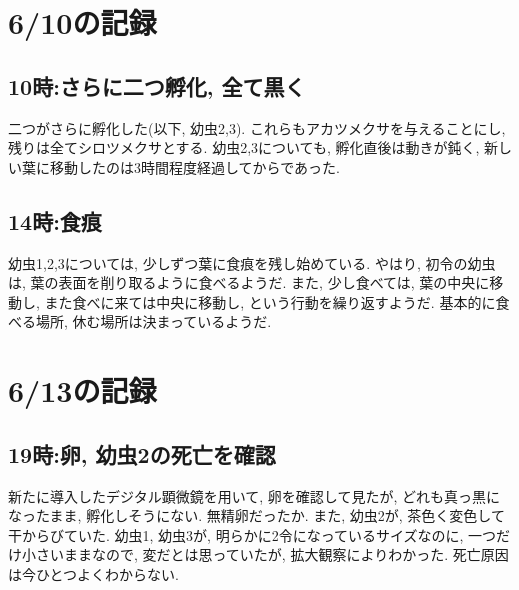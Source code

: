 \documentclass{jsarticle}
\begin{document}
\section{6/10の記録}
\subsection{10時:さらに二つ孵化, 全て黒く}
二つがさらに孵化した(以下, 幼虫2,3). これらもアカツメクサを与えることにし, 残りは全てシロツメクサとする. 
幼虫2,3についても, 孵化直後は動きが鈍く, 新しい葉に移動したのは3時間程度経過してからであった. 

\subsection{14時:食痕}
幼虫1,2,3については, 少しずつ葉に食痕を残し始めている. やはり, 初令の幼虫は, 葉の表面を削り取るように食べるようだ. 
また, 少し食べては, 葉の中央に移動し, また食べに来ては中央に移動し, という行動を繰り返すようだ. 
基本的に食べる場所, 休む場所は決まっているようだ. 

\section{6/13の記録}
\subsection{19時:卵, 幼虫2の死亡を確認}
新たに導入したデジタル顕微鏡を用いて, 卵を確認して見たが, どれも真っ黒になったまま, 孵化しそうにない. 
無精卵だったか. 
また, 幼虫2が, 茶色く変色して干からびていた. 幼虫1, 幼虫3が, 明らかに2令になっているサイズなのに, 一つだけ小さいままなので, 変だとは思っていたが, 拡大観察によりわかった. 
死亡原因は今ひとつよくわからない. 
\end{document}
